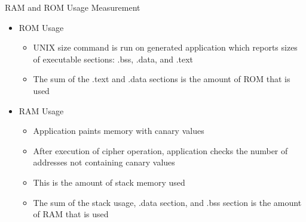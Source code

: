 \documentclass[xcolor=pdftex,dvipsnames,table,final]{beamer}
\begin{document}
\begin{frame}[fragile]{}
\begin{columns}[t, totalwidth=\textwidth]
\begin{column}{.675\linewidth}
\begin{columns}
\begin{column}{.473\linewidth}
      \begin{block}{RAM and ROM Usage Measurement}
        \begin{itemize}
          \item ROM Usage
            \begin{itemize}
              \item UNIX size command is run on generated application which
                    reports sizes of executable sections: .bss, .data, and .text
              \item The sum of the .text and .data sections is the amount of ROM that is used
            \end{itemize}
          \item RAM Usage
            \begin{itemize}
              \item Application paints memory with canary values
              \item After execution of cipher operation, application checks
                    the number of addresses not containing canary values
              \item This is the amount of stack memory used
              \item The sum of the stack usage, .data section, and .bss section is the amount of RAM that is used
            \end{itemize}
          
        \end{itemize}

      \end{block}


\end{column}
\end{columns}
\end{column}
\end{columns}
\end{frame}
\end{document}

